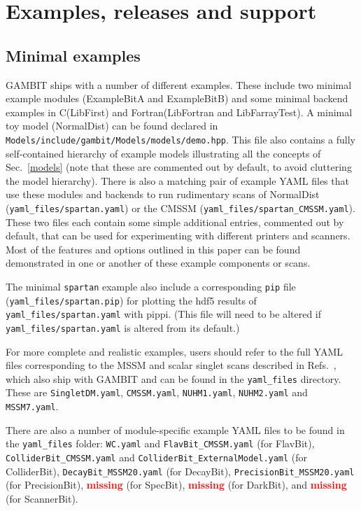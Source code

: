 \documentclass[pdftex,twocolumn,epjc3_preprint,runningheads]{svjour3}
\renewcommand{\_}{\discretionary{\underscore}{}{\underscore}}
\newcommand\term[1]{{\lstset{style=terminal}\lstinline!#1!\lstset{style=cpp}}}
\newcommand{\gambit}{\textsf{GAMBIT}\xspace}
\newcommand{\darkbit}{\textsf{DarkBit}\xspace}
\newcommand{\colliderbit}{\textsf{ColliderBit}\xspace}
\newcommand{\flavbit}{\textsf{FlavBit}\xspace}
\newcommand{\specbit}{\textsf{SpecBit}\xspace}
\newcommand{\decaybit}{\textsf{DecayBit}\xspace}
\newcommand{\precisionbit}{\textsf{PrecisionBit}\xspace}
\newcommand{\scannerbit}{\textsf{ScannerBit}\xspace}
\newcommand{\GB}{\gambit}
\newcommand\pippi{\textsf{pippi}\xspace}
\newcommand\plainC{\textsf{C}\xspace}
\newcommand\Fortran{\textsf{Fortran}\xspace}
\newcommand\YAML{\textsf{YAML}\xspace}
\newcommand{\TODO}[1]{\textbf{\textcolor{red}{#1}}}
\begin{document}
\section{Examples, releases and support}
\label{examples++}

\subsection{Minimal examples}
\label{examples}

\GB ships with a number of different examples.  These include two minimal example modules (\textsf{ExampleBit\_A} and \textsf{ExampleBit\_B}) and some minimal backend examples in \plainC (\textsf{LibFirst}) and \Fortran (\textsf{LibFortran} and \textsf{LibFarrayTest}).  A minimal toy model (\textsf{NormalDist}) can be found declared in \term{Models/include/gambit/Models/models/demo.hpp}.  This file also contains a fully self-contained hierarchy of example models illustrating all the concepts of Sec.\ \ref{models} (note that these are commented out by default, to avoid cluttering the model hierarchy). There is also a matching pair of example \YAML files that use these modules and backends to run rudimentary scans of \textsf{NormalDist} (\term{yaml_files/spartan.yaml}) or the \textsf{CMSSM} (\term{yaml_files/spartan_CMSSM.yaml}).  These two files each contain some simple additional entries, commented out by default, that can be used for experimenting with different printers and scanners.  Most of the features and options outlined in this paper can be found demonstrated in one or another of these example components or scans.

The minimal \term{spartan} example also include a corresponding \term{pip} file (\term{yaml_files/spartan.pip}) for plotting the \textsf{hdf5} results of \term{yaml_files/spartan.yaml} with \pippi \cite{pippi}.  (This file will need to be altered if \term{yaml_files/spartan.yaml} is altered from its default.)

For more complete and realistic examples, users should refer to the full \YAML files corresponding to the MSSM and scalar singlet scans described in Refs.\ \cite{CMSSM,MSSM,SSDM}, which also ship with \GB and can be found in the \term{yaml_files} directory.  These are \term{SingletDM.yaml}, \term{CMSSM.yaml}, \term{NUHM1.yaml}, \term{NUHM2.yaml} and \term{MSSM7.yaml}.

There are also a number of module-specific example \YAML files to be found in the \term{yaml_files} folder: \term{WC.yaml} and \term{FlavBit_CMSSM.yaml} (for \flavbit), \term{ColliderBit_CMSSM.yaml} and \term{ColliderBit_ExternalModel.yaml} (for \colliderbit), \term{DecayBit_MSSM20.yaml} (for \decaybit), \term{PrecisionBit_MSSM20.yaml} (for \precisionbit), \TODO{missing} (for \specbit), \TODO{missing} (for \darkbit), and \TODO{missing} (for \scannerbit).
\end{document}
